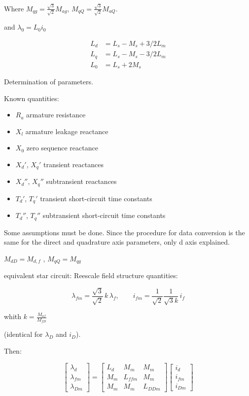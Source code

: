 Where $M_{qg} = \frac{\sqrt{3}}{\sqrt{2}} M_{ag}$, $M_{qQ} = \frac{\sqrt{3}}{\sqrt{2}} M_{aQ}$.

and $\lambda_0 = L_0 i_0$


\begin{equation}
    \begin{align}
        L_d &= L_s - M_s + 3/2 L_m \\
        L_q &= L_s - M_s - 3/2L_m \\
        L_0 &= L_s + 2M_s
    \end{align}
\end{equation}

Determination of parameters.

Known quantities:
\begin{itemize}
    \item $R_a$ armature resistance
    \item $X_l$ armature leakage reactance
    \item $X_0$ zero sequence reactance
    \item $X_d'$, $X_q'$ transient reactances
    \item $X_d''$, $X_q''$ subtransient reactances
    \item $T_d'$, $T_q'$ transient short-circuit time constants
    \item $T_d''$, $T_q''$ subtransient short-circuit time constants
\end{itemize}

Some assumptions must be done. Since the procedure for data conversion is the same for the direct and quadrature axis parameters, only d axis explained.

$M_{dD} = M_{d,f}$ , $M_{qQ} = M_{qg}$

equivalent star circuit: Reescale field structure quantities:

\begin{equation}
\lambda_{fm} = \frac{\sqrt{3}}{\sqrt{2}}\, k \, \lambda_f, 
\qquad 
i_{fm} = \frac{1}{\sqrt{2}} \frac{1}{\sqrt{3}k}\, i_f
\end{equation}

whith $k = \frac{M_{af}}{M_{fD}}$

(identical for $\lambda_D$ and $i_D$). 


Then:

\begin{equation}
\begin{bmatrix}
\lambda_d \\[4pt]
\lambda_{fm} \\[4pt]
\lambda_{Dm}
\end{bmatrix}
=
\begin{bmatrix}
L_d & M_m & M_m \\[4pt]
M_m & L_{ffm} & M_m \\[4pt]
M_m & M_m & L_{DDm}
\end{bmatrix}
\begin{bmatrix}
i_d \\[4pt]
i_{fm} \\[4pt]
i_{Dm}
\end{bmatrix}
\end{equation}

